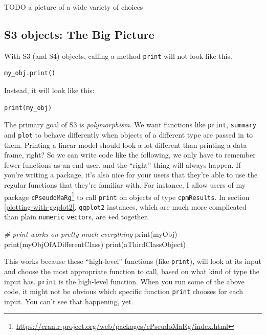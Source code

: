 \documentclass[
  12pt,
  krantz2]{krantz}
\makeatletter
\newenvironment{Shaded}{\begin{snugshade}}{\end{snugshade}}
\newcommand{\CommentTok}[1]{\textcolor[rgb]{0.37,0.37,0.37}{\textit{#1}}}
\newcommand{\FunctionTok}[1]{\textcolor[rgb]{0,0,0}{#1}}
\newcommand{\NormalTok}[1]{#1}
\renewcommand{\href}[2]{#2\footnote{\url{#1}}}
\newenvironment{kframe}{%
\medskip{}
\setlength{\fboxsep}{.8em}
 \def\at@end@of@kframe{}%
 \ifinner\ifhmode%
  \def\at@end@of@kframe{\end{minipage}}%
  \begin{minipage}{\columnwidth}%
 \fi\fi%
 \def\FrameCommand##1{\hskip\@totalleftmargin \hskip-\fboxsep
 \colorbox{shadecolor}{##1}\hskip-\fboxsep
     \hskip-\linewidth \hskip-\@totalleftmargin \hskip\columnwidth}%
 \MakeFramed {\advance\hsize-\width
   \@totalleftmargin\z@ \linewidth\hsize
   \@setminipage}}%
 {\par\unskip\endMakeFramed%
 \at@end@of@kframe}
\renewenvironment{Shaded}{\begin{kframe}}{\end{kframe}}
\makeatother
\begin{document}
TODO a picture of a wide variety of choices

\hypertarget{s3-objects-the-big-picture}{%
\subsection{S3 objects: The Big Picture}\label{s3-objects-the-big-picture}}

With S3 (and S4) objects, calling a method \texttt{print} will not look like this.

\begin{verbatim}
my_obj.print()
\end{verbatim}

Instead, it will look like this:

\begin{verbatim}
print(my_obj)
\end{verbatim}

The primary goal of S3 is \emph{polymorphism}. We want functions like \texttt{print}, \texttt{summary} and \texttt{plot} to behave differently when objects of a different type are passed in to them. Printing a linear model should look a lot different than printing a data frame, right? So we can write code like the following, we only have to remember fewer functions as an end-user, and the ``right'' thing will always happen. If you're writing a package, it's also nice for your users that they're able to use the regular functions that they're familiar with. For instance, I allow users of my package \href{https://cran.r-project.org/web/packages/cPseudoMaRg/index.html}{\texttt{cPseudoMaRg}} \citep{cpm} to call \texttt{print} on objects of type \texttt{cpmResults}. In section \ref{plotting-with-ggplot2}, \texttt{ggplot2} instances, which are much more complicated than plain \texttt{numeric} \texttt{vector}s, are \texttt{+}ed together.

\begin{Shaded}
\begin{Highlighting}[]
\CommentTok{\# print works on pretty much everything}
\FunctionTok{print}\NormalTok{(myObj)}
\FunctionTok{print}\NormalTok{(myObjOfADifferentClass)}
\FunctionTok{print}\NormalTok{(aThirdClassObject)}
\end{Highlighting}
\end{Shaded}

This works because these ``high-level'' functions (like \texttt{print}), will look at its input and choose the most appropriate function to call, based on what kind of type the input has. \texttt{print} is the high-level function. When you run some of the above code, it might not be obvious which specific function \texttt{print} chooses for each input. You can't see that happening, yet.
\end{document}
